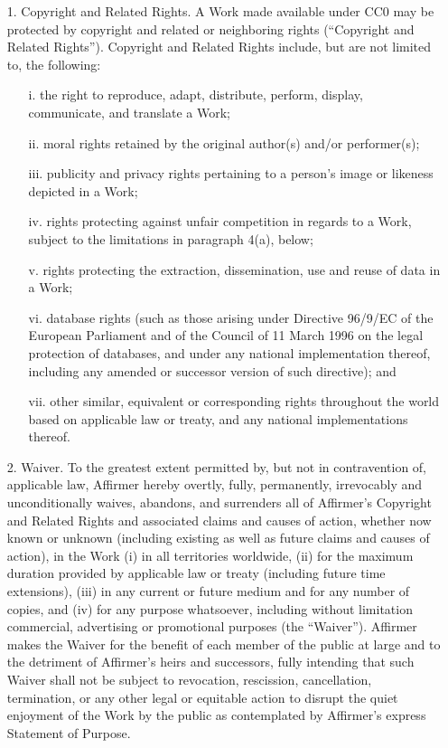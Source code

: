 \documentclass{tufte-book}
\begin{document}
\begin{fullwidth}
	\begin{enumerate}
		\item[1.] Copyright and Related Rights. A Work made available under CC$0$ may be protected by copyright and related or neighboring rights (``Copyright and Related Rights''). Copyright and Related Rights include, but are not limited to, the following:
		
			\begin{enumerate}
				\item[i.] the right to reproduce, adapt, distribute, perform, display, communicate, and translate a Work;
		
				\item[ii.] moral rights retained by the original author(s) and/or performer(s);
		
				\item[iii.] publicity and privacy rights pertaining to a person's image or likeness depicted in a Work;
		
				\item[iv.] rights protecting against unfair competition in regards to a Work, subject to the limitations in paragraph 4(a), below;
		
				\item[v.] rights protecting the extraction, dissemination, use and reuse of data in a Work;
		
				\item[vi.] database rights (such as those arising under Directive 96/9/EC of the European Parliament and of the Council of 11 March 1996 on the legal protection of databases, and under any national implementation thereof, including any amended or successor version of such directive); and
		
				\item[vii.] other similar, equivalent or corresponding rights throughout the world based on applicable law or treaty, and any national implementations thereof.
			\end{enumerate}
			
		\item[2.] Waiver. To the greatest extent permitted by, but not in contravention of, applicable law, Affirmer hereby overtly, fully, permanently, irrevocably and unconditionally waives, abandons, and surrenders all of Affirmer's Copyright and Related Rights and associated claims and causes of action, whether now known or unknown (including existing as well as future claims and causes of action), in the Work (i) in all territories worldwide, (ii) for the maximum duration provided by applicable law or treaty (including future time extensions), (iii) in any current or future medium and for any number of copies, and (iv) for any purpose whatsoever, including without limitation commercial, advertising or promotional purposes (the ``Waiver''). Affirmer makes the Waiver for the benefit of each member of the public at large and to the detriment of Affirmer's heirs and successors, fully intending that such Waiver shall not be subject to revocation, rescission, cancellation, termination, or any other legal or equitable action to disrupt the quiet enjoyment of the Work by the public as contemplated by Affirmer's express Statement of Purpose.
		

\end{enumerate}
\end{fullwidth}
\end{document}
